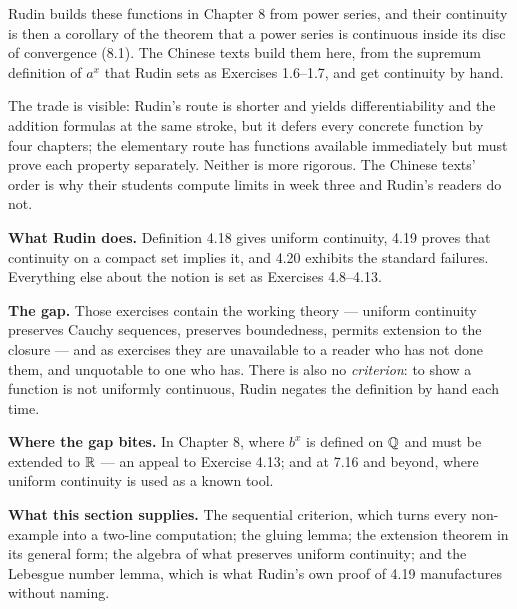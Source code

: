 \begin{deeper}
Rudin builds these functions in Chapter 8 from power series, and their
continuity is then a corollary of the theorem that a power series is
continuous inside its disc of convergence (8.1). The Chinese texts build
them here, from the supremum definition of $a^x$ that Rudin sets as
Exercises 1.6--1.7, and get continuity by hand.

The trade is visible: Rudin's route is shorter and yields differentiability
and the addition formulas at the same stroke, but it defers every concrete
function by four chapters; the elementary route has functions available
immediately but must prove each property separately. Neither is more
rigorous. The Chinese texts' order is why their students compute limits in
week three and Rudin's readers do not.
\end{deeper}


\begin{roadmap}
\raggedright
\textbf{What Rudin does.} Definition 4.18 gives uniform continuity, 4.19
proves that continuity on a compact set implies it, and 4.20 exhibits the
standard failures. Everything else about the notion is set as Exercises
4.8--4.13.

\smallskip
\textbf{The gap.} Those exercises contain the working theory --- uniform
continuity preserves Cauchy sequences, preserves boundedness, permits
extension to the closure --- and as exercises they are unavailable to a
reader who has not done them, and unquotable to one who has. There is also
no \emph{criterion}: to show a function is not uniformly continuous, Rudin
negates the definition by hand each time.

\smallskip
\textbf{Where the gap bites.} In Chapter 8, where $b^x$ is defined on $\mathbb{Q}$
and must be extended to $\mathbb{R}$ --- an appeal to Exercise 4.13; and at 7.16 and
beyond, where uniform continuity is used as a known tool.

\smallskip
\textbf{What this section supplies.} The sequential criterion, which turns
every non-example into a two-line computation; the gluing lemma; the
extension theorem in its general form; the algebra of what preserves uniform
continuity; and the Lebesgue number lemma, which is what Rudin's own proof of
4.19 manufactures without naming.
\end{roadmap}

